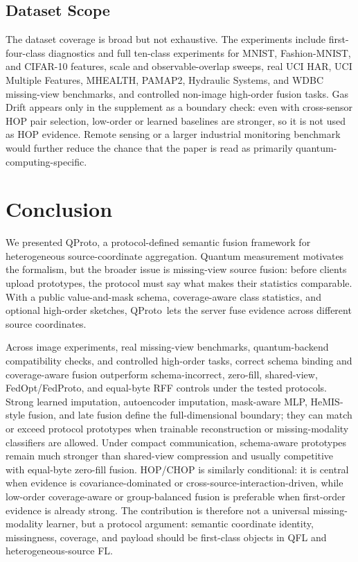 \documentclass[preprint]{elsarticle}
\newcommand{\method}{QProto}
\begin{document}
\subsection{Dataset Scope}

The dataset coverage is broad but not exhaustive. The experiments include first-four-class diagnostics and full ten-class experiments for MNIST, Fashion-MNIST, and CIFAR-10 features, scale and observable-overlap sweeps, real UCI HAR, UCI Multiple Features, MHEALTH, PAMAP2, Hydraulic Systems, and WDBC missing-view benchmarks, and controlled non-image high-order fusion tasks. Gas Drift appears only in the supplement as a boundary check: even with cross-sensor HOP pair selection, low-order or learned baselines are stronger, so it is not used as HOP evidence. Remote sensing or a larger industrial monitoring benchmark would further reduce the chance that the paper is read as primarily quantum-computing-specific.

\section{Conclusion}

We presented \method, a protocol-defined semantic fusion framework for heterogeneous source-coordinate aggregation. Quantum measurement motivates the formalism, but the broader issue is missing-view source fusion: before clients upload prototypes, the protocol must say what makes their statistics comparable. With a public value-and-mask schema, coverage-aware class statistics, and optional high-order sketches, \method\ lets the server fuse evidence across different source coordinates.

Across image experiments, real missing-view benchmarks, quantum-backend compatibility checks, and controlled high-order tasks, correct schema binding and coverage-aware fusion outperform schema-incorrect, zero-fill, shared-view, FedOpt/FedProto, and equal-byte RFF controls under the tested protocols. Strong learned imputation, autoencoder imputation, mask-aware MLP, HeMIS-style fusion, and late fusion define the full-dimensional boundary; they can match or exceed protocol prototypes when trainable reconstruction or missing-modality classifiers are allowed. Under compact communication, schema-aware prototypes remain much stronger than shared-view compression and usually competitive with equal-byte zero-fill fusion. HOP/CHOP is similarly conditional: it is central when evidence is covariance-dominated or cross-source-interaction-driven, while low-order coverage-aware or group-balanced fusion is preferable when first-order evidence is already strong. The contribution is therefore not a universal missing-modality learner, but a protocol argument: semantic coordinate identity, missingness, coverage, and payload should be first-class objects in QFL and heterogeneous-source FL.
\end{document}
